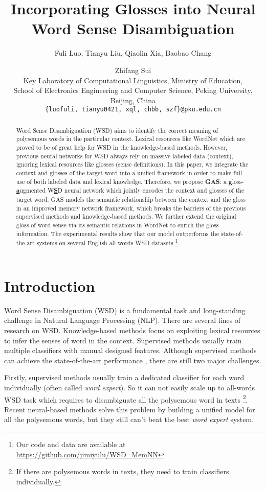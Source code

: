 \documentclass[11pt,a4paper]{article}
\title{
Incorporating Glosses into Neural Word Sense Disambiguation
}
\author{Fuli Luo, Tianyu Liu, Qiaolin Xia, Baobao Chang \and Zhifang Sui \\
Key Laboratory of Computational Linguistics, Ministry of Education, \\School of Electronics Engineering and Computer Science, Peking University, Beijing, China\\
  {\tt \{luofuli, tianyu0421, xql, chbb, szf\}@pku.edu.cn}}
\date{}
\begin{document}
\maketitle
\begin{abstract}
Word Sense Disambiguation (WSD) aims to identify the correct meaning of polysemous words in the particular context.
Lexical resources like WordNet which are proved to be of great help for WSD in the knowledge-based methods.
However, previous neural networks for WSD always rely on massive labeled data (context),
ignoring lexical resources like glosses (sense definitions).
In this paper, we integrate the context and glosses of the target word into a unified framework in order to make full use of both labeled data and lexical knowledge.
Therefore, we propose \textbf{GAS}: a \uline{\bf g}loss-\uline{\bf a}ugmented W\uline{\bf S}D neural network which jointly encodes the context and glosses of the target word.
GAS models the semantic relationship between the context and the gloss  in an improved memory network framework, which breaks the barriers of the previous supervised methods and knowledge-based methods.
We further extend the original gloss of word sense via its semantic relations in WordNet to enrich the gloss information.
The experimental results show that our model outperforms the state-of-the-art systems on several English all-words WSD datasets \footnote{Our code and data are available at \url{https://github.com/jimiyulu/WSD_MemNN}}.
\end{abstract}

\section{Introduction}
Word Sense Disambiguation (WSD) is a fundamental task and long-standing challenge in Natural Language Processing (NLP).
There are several lines of research on WSD.
Knowledge-based methods
focus on exploiting lexical resources to infer the senses of word in the context.
Supervised methods
usually train multiple classifiers with manual designed features.
Although supervised methods can achieve the state-of-the-art performance \cite{raganato2017wsdData,Raganato2017}, there are still two major challenges.

Firstly, supervised methods \cite{Zhong2010IMS,Iacobacci2016} usually train a dedicated classifier for each word individually (often called {\em word expert}). So it can not easily scale up to all-words WSD task which requires to disambiguate all the polysemous word in texts \footnote{If there are  polysemous words in texts, they need to train  classifiers individually.}.
Recent neural-based methods \cite{bilstm, Raganato2017} solve this problem by building a unified model for all the polysemous words, but they still can't beat the best {\em word expert} system.
\end{document}
